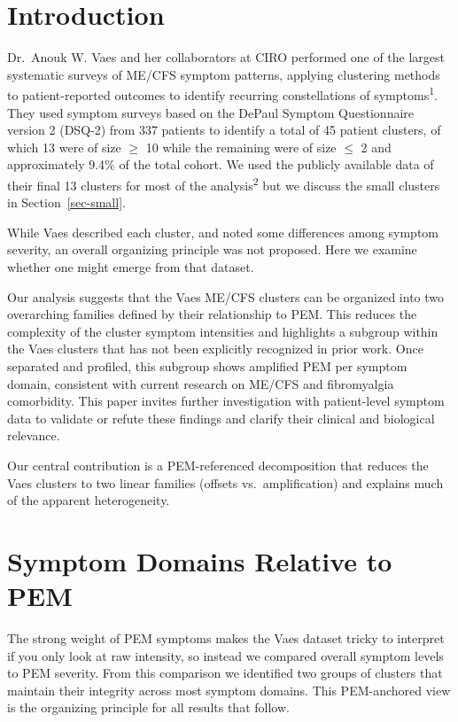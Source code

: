 \documentclass[
  letterpaper,
  DIV=11,
  numbers=noendperiod]{scrartcl}
\begin{document}
\newpage{}

\section{Introduction}\label{introduction}

Dr.~Anouk W. Vaes and her collaborators at CIRO performed one of the
largest systematic surveys of ME/CFS symptom patterns, applying
clustering methods to patient-reported outcomes to identify recurring
constellations of symptoms\textsuperscript{1}. They used symptom surveys
based on the DePaul Symptom Questionnaire version 2 (DSQ-2) from 337
patients to identify a total of 45 patient clusters, of which 13 were of
size \(\geq\) 10 while the remaining were of size \(\leq\) 2 and
approximately 9.4\% of the total cohort. We used the publicly available
data of their final 13 clusters for most of the
analysis\textsuperscript{2} but we discuss the small clusters in
Section~\ref{sec-small}.

While Vaes described each cluster, and noted some differences among
symptom severity, an overall organizing principle was not proposed. Here
we examine whether one might emerge from that dataset.

Our analysis suggests that the Vaes ME/CFS clusters can be organized
into two overarching families defined by their relationship to PEM. This
reduces the complexity of the cluster symptom intensities and highlights
a subgroup within the Vaes clusters that has not been explicitly
recognized in prior work. Once separated and profiled, this subgroup
shows amplified PEM per symptom domain, consistent with current research
on ME/CFS and fibromyalgia comorbidity. This paper invites further
investigation with patient-level symptom data to validate or refute
these findings and clarify their clinical and biological relevance.

Our central contribution is a PEM-referenced decomposition that reduces
the Vaes clusters to two linear families (offsets vs.~amplification) and
explains much of the apparent heterogeneity.

\section{Symptom Domains Relative to PEM}\label{sec-symptoms}

The strong weight of PEM symptoms makes the Vaes dataset tricky to
interpret if you only look at raw intensity, so instead we compared
overall symptom levels to PEM severity. From this comparison we
identified two groups of clusters that maintain their integrity across
most symptom domains. This PEM-anchored view is the organizing principle
for all results that follow.
\end{document}
